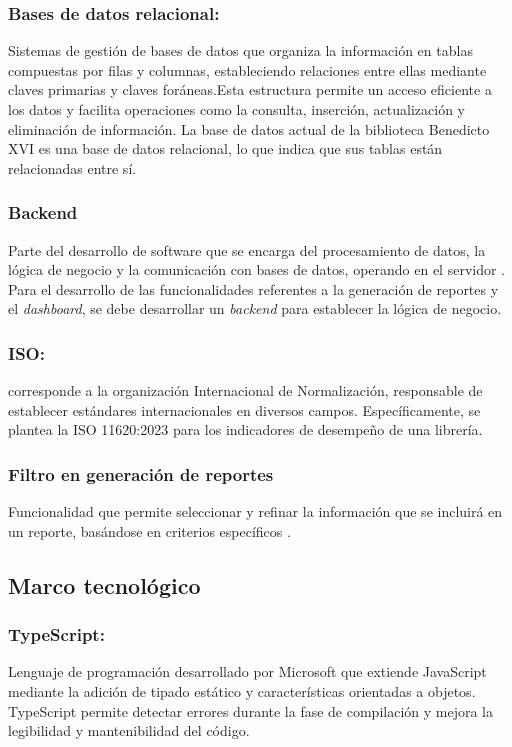 \documentclass[spanish]{ieee_upb}
\begin{document}
  \subsubsection{Bases de datos relacional: } Sistemas de gestión de bases de datos que organiza la información en tablas compuestas por filas y columnas, estableciendo relaciones entre ellas mediante claves primarias y claves foráneas\cite{ibm_relational_databases}.Esta estructura permite un acceso eficiente a los datos y facilita operaciones como la consulta, inserción, actualización y eliminación de información\cite{ionos_relational_databases}.   La base de datos actual de la biblioteca Benedicto XVI es una base de datos relacional, lo que indica que sus tablas están relacionadas entre sí.

  \subsubsection{Backend} Parte del desarrollo de software que se encarga del procesamiento de datos, la lógica de negocio y la comunicación con bases de datos, operando en el servidor \cite{ibm_backend_2020}. Para el desarrollo de las funcionalidades referentes a la generación de reportes y el \textit{dashboard}, se debe desarrollar un \textit{backend} para establecer la lógica de negocio.

  \subsubsection{ISO: } corresponde a la  organización Internacional de Normalización, responsable de establecer estándares internacionales en diversos campos\cite{iso_standards_2019}. Específicamente, se plantea la ISO 11620:2023 para los indicadores de desempeño de una librería\cite{iso11620_2023Library}.  

  \subsubsection{Filtro en generación de reportes} Funcionalidad que permite seleccionar y refinar la información que se incluirá en un reporte, basándose en criterios específicos \cite{ibm_report_filter_2021}.
\subsection{Marco tecnológico}

    \subsubsection{TypeScript:} Lenguaje de programación desarrollado por Microsoft que extiende JavaScript mediante la adición de tipado estático y características orientadas a objetos. TypeScript permite detectar errores durante la fase de compilación y mejora la legibilidad y mantenibilidad del código\cite{typescript_2020}.
  
\end{document}
